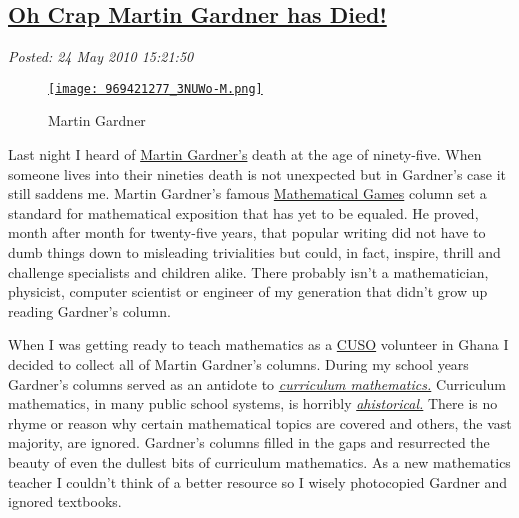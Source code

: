 %

\subsection*{\href{http://bakerjd99.wordpress.com/2010/05/24/oh-crap-martin-gardner-has-died/}{Oh Crap Martin Gardner has Died!}}


\noindent\emph{Posted: 24 May 2010 15:21:50}
\vspace{6pt}


\captionsetup[figure]{labelformat=empty}
\begin{figure}[htbp]
\centering
\href{http://www.mathpuzzle.com/28Jun04.html}{\texttt{[image: 969421277\_3NUWo-M.png]}}
\caption{Martin  Gardner}
\label{fig:526X0}
\end{figure}


Last night I heard of
\href{http://en.wikipedia.org/wiki/Martin\_Gardner}{Martin Gardner's}
death at the age of ninety-five. When someone lives into their nineties
death is not unexpected but in Gardner's case it still saddens me.
Martin Gardner's famous
\href{http://www.amazon.com/Martin-Gardners-Mathematical-Games-Gardner/dp/0883855453}{Mathematical
Games} column set a standard for mathematical exposition that has yet to
be equaled. He proved, month after month for twenty-five years, that
popular writing did not have to dumb things down to misleading
trivialities but could, in fact, inspire, thrill and challenge
specialists and children alike. There probably isn't a mathematician,
physicist, computer scientist or engineer of my generation that didn't
grow up reading Gardner's column.

When I was getting ready to teach mathematics as a
\href{http://www.cuso-vso.org/}{CUSO} volunteer in Ghana I decided to
collect all of Martin Gardner's columns. During my school years
Gardner's columns served as an antidote to
\emph{\href{http://www2.edc.org/mcc/}{curriculum mathematics.}}
Curriculum mathematics, in many public school systems, is horribly
\emph{\href{http://wordnetweb.princeton.edu/perl/webwn?s=ahistorical}{ahistorical.}}
There is no rhyme or reason why certain mathematical topics are covered
and others, the vast majority, are ignored. Gardner's columns filled in
the gaps and resurrected the beauty of even the dullest bits of
curriculum mathematics. As a new mathematics teacher I couldn't think of
a better resource so I wisely photocopied Gardner and ignored textbooks.

